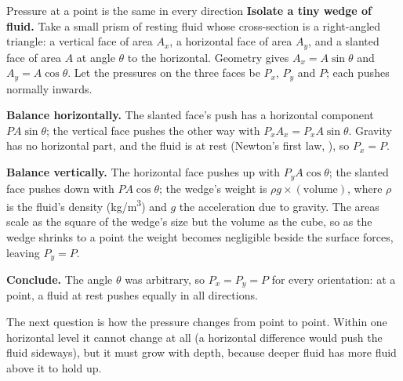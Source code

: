 \begin{derivbox}{Pressure at a point is the same in every direction}
 \textbf{Isolate a tiny wedge of fluid.} Take a small prism of resting fluid whose cross-section is
a right-angled triangle: a vertical face of area $A_x$, a horizontal face of area $A_y$, and a slanted face
of area $A$ at angle $\theta$ to the horizontal. Geometry gives $A_x=A\sin\theta$ and $A_y=A\cos\theta$.
Let the pressures on the three faces be $P_x$, $P_y$ and $P$; each pushes normally inwards.

 \textbf{Balance horizontally.} The slanted face's push has a horizontal component
$PA\sin\theta$; the vertical face pushes the other way with $P_xA_x=P_xA\sin\theta$. Gravity has no
horizontal part, and the fluid is at rest (Newton's first law, ), so $P_x=P$.

 \textbf{Balance vertically.} The horizontal face pushes up with $P_yA\cos\theta$; the slanted face
pushes down with $PA\cos\theta$; the wedge's weight is $\rho g\times(\text{volume})$, where $\rho$ is the
fluid's density (\si{kg/m^3}) and $g$ the acceleration due to gravity. The areas scale as the square of
the wedge's size but the volume as the cube, so as the wedge shrinks to a point the weight becomes
negligible beside the surface forces, leaving $P_y=P$.

 \textbf{Conclude.} The angle $\theta$ was arbitrary, so $P_x=P_y=P$ for every orientation: at a
point, a fluid at rest pushes equally in all directions.
\end{derivbox}


The next question is how the pressure changes from point to point. Within one horizontal level it cannot
change at all (a horizontal difference would push the fluid sideways), but it must grow with depth, because
deeper fluid has more fluid above it to hold up.

